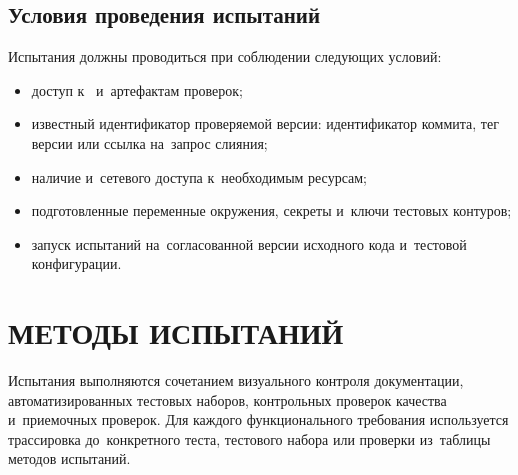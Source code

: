\documentclass[12pt,a4paper]{extarticle}
\begin{document}
\subsection{Условия проведения испытаний}

\begin{hseExample}
Испытания должны проводиться при соблюдении следующих условий:

\begin{itemize}[leftmargin=1.25cm]
    \item доступ к~ и~артефактам проверок;
    \item известный идентификатор проверяемой версии: идентификатор коммита, тег версии или ссылка на~запрос слияния;
    \item наличие  и~сетевого доступа к~необходимым ресурсам;
    \item подготовленные переменные окружения, секреты и~ключи тестовых контуров;
    \item запуск испытаний на~согласованной версии исходного кода и~тестовой конфигурации.
\end{itemize}
\end{hseExample}

\clearpage

\section{МЕТОДЫ ИСПЫТАНИЙ}
\label{sec:methods}

\begin{hseExample}
Испытания выполняются сочетанием визуального контроля документации, автоматизированных тестовых наборов, контрольных проверок качества и~приемочных проверок. Для каждого функционального требования используется трассировка до~конкретного теста, тестового набора или проверки из~таблицы методов испытаний.
\end{hseExample}

\end{document}
